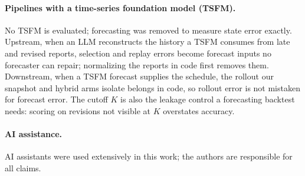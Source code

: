 \documentclass{article}
\begin{document}
\paragraph{Pipelines with a time-series foundation model (TSFM).}
No TSFM is evaluated; forecasting was removed to measure state error exactly. Upstream, when an LLM reconstructs the history a TSFM consumes from late and revised reports,
selection and replay errors become forecast inputs no forecaster can repair; normalizing
the reports in code first removes them. Downstream, when a TSFM forecast supplies the
schedule, the rollout our snapshot and hybrid arms isolate belongs in code, so rollout error
is not mistaken for forecast error. The cutoff $K$ is also the leakage control a forecasting
backtest needs: scoring on revisions not visible at $K$ overstates accuracy.

\paragraph{AI assistance.} AI assistants were used extensively in this work; the authors are responsible for all claims.

\clearpage


\clearpage

\end{document}

